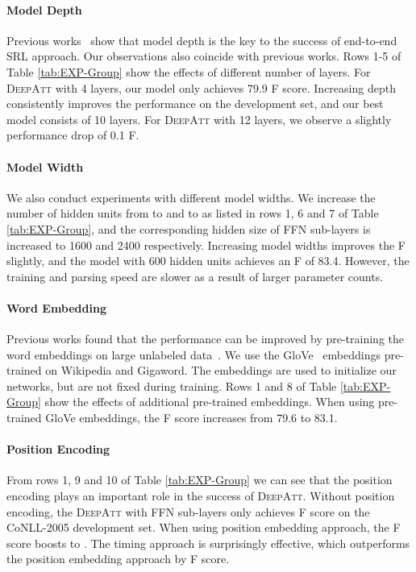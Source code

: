 \documentclass[letterpaper]{article} \usepackage{aaai18}  \usepackage{times}  \usepackage{helvet}  \usepackage{courier}  \usepackage{url}  \usepackage{graphicx}  \frenchspacing  \setlength{\pdfpagewidth}{8.5in}  \setlength{\pdfpageheight}{11in}  \usepackage{latexsym}
\begin{document}
\paragraph{Model Depth}
Previous works~\cite{zhou2015end,he2017deep} show that model depth is the key to the success of end-to-end SRL approach. Our observations also coincide with previous works. Rows 1-5 of Table \ref{tab:EXP-Group} show the effects of different number of layers. For \textsc{DeepAtt} with 4 layers, our model only achieves 79.9 F score. Increasing depth consistently improves the performance on the development set, and our best model consists of 10 layers. For \textsc{DeepAtt} with 12 layers, we observe a slightly performance drop of 0.1 F.

\paragraph{Model Width} We also conduct experiments with different model widths. We increase the number of hidden units from  to  and  to  as listed in rows 1, 6 and 7 of Table \ref{tab:EXP-Group}, and the corresponding hidden size  of FFN sub-layers is increased to 1600 and 2400 respectively. Increasing model widths improves the F slightly, and the model with 600 hidden units achieves an F of 83.4. However, the training and parsing speed are slower as a result of larger parameter counts.

\paragraph{Word Embedding}
Previous works found that the performance can be improved by pre-training the word embeddings on large unlabeled data~\cite{Collobert-Ronan-JMLR2011,zhou2015end}. We use the GloVe~\cite{pennington2014glove} embeddings pre-trained on Wikipedia and Gigaword. The embeddings are used to initialize our networks, but are not fixed during training. Rows 1 and 8 of Table \ref{tab:EXP-Group} show the effects of additional pre-trained embeddings. When using pre-trained GloVe embeddings, the F score increases from 79.6 to 83.1.

\paragraph{Position Encoding}
From rows 1, 9 and 10 of Table \ref{tab:EXP-Group} we can see that the position encoding plays an important role in the success of \textsc{DeepAtt}. Without position encoding, the \textsc{DeepAtt} with FFN sub-layers only achieves  F score on the CoNLL-2005 development set. When using position embedding approach, the F score boosts to . The timing approach is surprisingly effective, which outperforms the position embedding approach by  F score.
\end{document}
